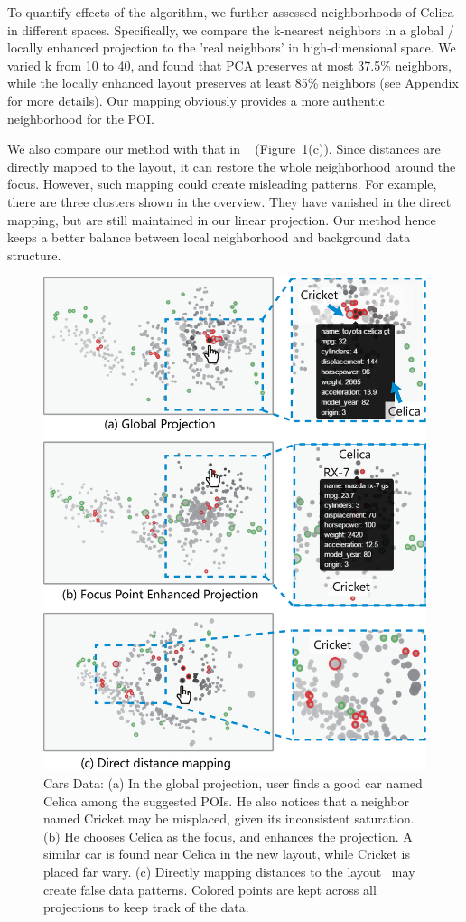 To quantify effects of the algorithm, we further assessed neighborhoods of Celica in different spaces. Specifically, we compare the k-nearest neighbors in a global / locally enhanced projection to the 'real neighbors' in high-dimensional space. We varied k from 10 to 40, and found that PCA preserves at most 37.5\% neighbors, while the locally enhanced layout preserves at least 85\% neighbors (see Appendix for more details). Our mapping obviously provides a more authentic neighborhood for the POI.

We also compare our method with that in ~\cite{DBLP:journals/tvcg/StahnkeDMT16} (Figure~\ref{fig:car}(c)). Since distances are directly mapped to the layout, it can restore the whole neighborhood around the focus. However, such mapping could create misleading patterns. For example, there are three clusters shown in the overview. They have vanished in the direct mapping, but are still maintained in our linear projection. Our method hence keeps a better balance between local neighborhood and background data structure.

\begin{figure}[htbp]
\centering
  \includegraphics[width=0.9\linewidth]{images/car_new.eps}%
  \caption{Cars Data: (a) In the global projection, user finds a good car named Celica among the suggested POIs. He also notices that a neighbor named Cricket may be misplaced, given its inconsistent saturation. (b) He chooses Celica as the focus, and enhances the projection. A similar car is found near Celica in the new layout, while Cricket is placed far wary. (c) Directly mapping distances to the layout~\cite{DBLP:journals/tvcg/StahnkeDMT16} may create false data patterns. Colored points are kept across all projections to keep track of the data.}
\label{fig:car}
  \end{figure}

